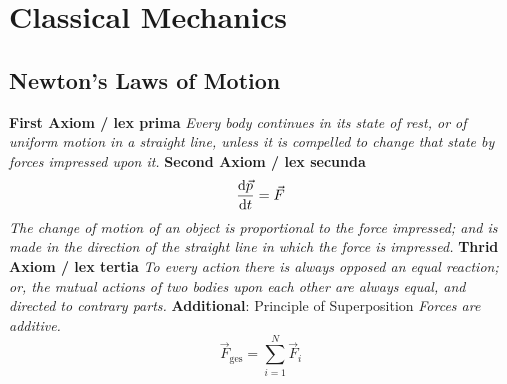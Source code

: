 \section{Classical Mechanics}
	\subsection{Newton's Laws of Motion}
		\textbf{First Axiom / lex prima} \newline%
			\indent \textit{Every body continues in its state of rest, or of uniform motion in a straight line, unless it is compelled to change that state by forces impressed upon it.} \nl%
		\textbf{Second Axiom / lex secunda}%
			\begin{equation}
				\frac{\mathrm{d} \vec{p}}{\mathrm{d} t} = \vec{F}
			\end{equation}
			\indent \textit{The change of motion of an object is proportional to the force impressed; and is made in the direction of the straight line in which the force is impressed.}\nl%
		\textbf{Thrid Axiom / lex tertia} \newline %
			\indent \textit{To every action there is always opposed an equal reaction; or, the mutual actions of two bodies upon each other are always equal, and directed to contrary parts.} \nl%
		\textbf{Additional}: Principle of Superposition \newline%
			\indent \textit{Forces are additive.}%
			\begin{equation}
				\vec{F}_{\mathrm{ges}} = \sum_{i=1}^{N} \vec{F}_i
			\end{equation}

